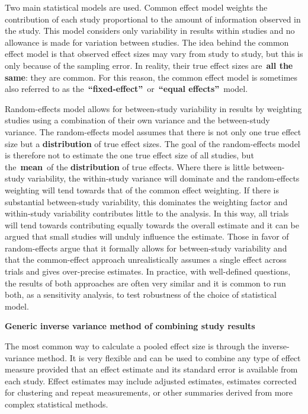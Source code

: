 \documentclass[
  11pt,
  a4paper,
  DIV=11,
  numbers=noendperiod]{scrreprt}
\begin{document}
Two main statistical models are used. Common effect model weights the
contribution of each study proportional to the amount of information
observed in the study. This model considers only variability in results
within studies and no allowance is made for variation between studies.
The idea behind the common effect model is that observed effect sizes
may vary from study to study, but this is only because of the sampling
error. In reality, their true effect sizes are~\textbf{all the same}:
they are common. For this reason, the common effect model is sometimes
also referred to as the~\textbf{``fixed-effect''}~or~\textbf{``equal
effects''}~model.

Random-effects model allows for between-study variability in results by
weighting studies using a combination of their own variance and the
between-study variance. The random-effects model assumes that there is
not only one true effect size but a \textbf{distribution} of true effect
sizes. The goal of the random-effects model is therefore not to estimate
the one true effect size of all studies, but the~\textbf{mean}~of the
\textbf{distribution} of true effects. Where there is little
between-study variability, the within-study variance will dominate and
the random-effects weighting will tend towards that of the common effect
weighting. If there is substantial between-study variability, this
dominates the weighting factor and within-study variability contributes
little to the analysis. In this way, all trials will tend towards
contributing equally towards the overall estimate and it can be argued
that small studies will unduly influence the estimate. Those in favor of
random-effects argue that it formally allows for between-study
variability and that the common-effect approach unrealistically assumes
a single effect across trials and gives over-precise estimates. In
practice, with well-defined questions, the results of both approaches
are often very similar and it is common to run both, as a sensitivity
analysis, to test robustness of the choice of statistical model.

\textbf{Generic inverse variance method of combining study results}

The most common way to calculate a pooled effect size is through the
inverse-variance method. It is very flexible and can be used to combine
any type of effect measure provided that an effect estimate and its
standard error is available from each study. Effect estimates may
include adjusted estimates, estimates corrected for clustering and
repeat measurements, or other summaries derived from more complex
statistical methods.
\end{document}
